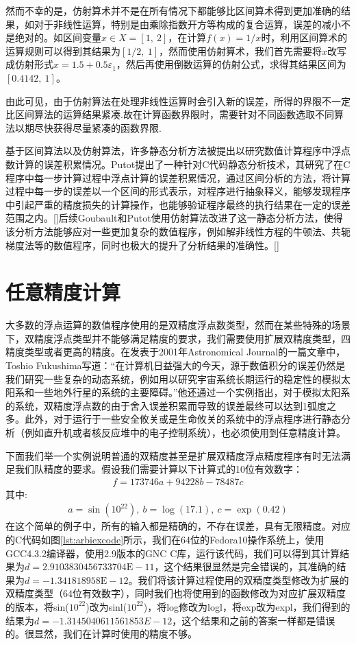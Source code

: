 然而不幸的是，仿射算术并不是在所有情况下都能够比区间算术得到更加准确的结果，如对于非线性运算，特别是由乘除指数开方等构成的复合运算，误差的减小不是绝对的。如区间变量$x \in X = [1,\ 2]$，在计算$f(x) = 1/x$时，利用区间算术的运算规则可以得到其结果为$[1/2 ,\ 1]$，然而使用仿射算术，我们首先需要将$x$改写成仿射形式$\hat{x} = 1.5 + 0.5\varepsilon_1$，然后再使用倒数运算的仿射公式，求得其结果区间为$[0.4142,\ 1]$。

由此可见，由于仿射算法在处理非线性运算时会引入新的误差，所得的界限不一定比区间算法的运算结果紧凑.故在计算函数界限时，需要针对不同函数选取不同算法以期尽快获得尽量紧凑的函数界限.

基于区间算法以及仿射算法，许多静态分析方法被提出以研究数值计算程序中浮点数计算的误差积累情况。Putot提出了一种针对C代码静态分析技术，其研究了在C程序中每一步计算过程中浮点计算的误差积累情况，通过区间分析的方法，将计算过程中每一步的误差以一个区间的形式表示，对程序进行抽象释义，能够发现程序中引起严重的精度损失的计算操作，也能够验证程序最终的执行结果在一定的误差范围之内。[]后续Goubault和Putot使用仿射算法改进了这一静态分析方法，使得该分析方法能够应对一些更加复杂的数值程序，例如解非线性方程的牛顿法、共轭梯度法等的数值程序，同时也极大的提升了分析结果的准确性。[]

\section{任意精度计算}

大多数的浮点运算的数值程序使用的是双精度浮点数类型，然而在某些特殊的场景下，双精度浮点类型并不能够满足精度的要求，我们需要使用扩展双精度类型，四精度类型或者更高的精度。在发表于2001年Astronomical Journal的一篇文章中，Toshio Fukushima写道：“在计算机日益强大的今天，源于数值积分的误差仍然是我们研究一些复杂的动态系统，例如用以研究宇宙系统长期运行的稳定性的模拟太阳系和一些地外行星的系统的主要障碍。”他还通过一个实例指出，对于模拟太阳系的系统，双精度浮点数的由于舍入误差积累而导致的误差最终可以达到1弧度之多。此外，对于运行于一些安全攸关或是生命攸关的系统中的浮点程序进行静态分析（例如直升机或者核反应堆中的电子控制系统），也必须使用到任意精度计算。

下面我们举一个实例说明普通的双精度甚至是扩展双精度浮点精度程序有时无法满足我们队精度的要求。假设我们需要计算以下计算式的10位有效数字：
\begin{align*}
    f = 173746a + 94228b - 78487c
\end{align*}
其中:
\begin{align*} 
    a = \sin(10^{22}),\ b = \log(17.1),\ c = \exp(0.42)
\end{align*}
在这个简单的例子中，所有的输入都是精确的，不存在误差，具有无限精度。对应的C代码如图\ref{lst:arbiexcode}所示，我们在64位的Fedora10操作系统上，使用GCC4.3.2编译器，使用2.9版本的GNC C库，运行该代码，我们可以得到其计算结果为$d = 2.9103830456733704\text{E}-11$，这个结果很显然是完全错误的，其准确的结果为$d = −1.341818958\text{E}−12$。我们将该计算过程使用的双精度类型修改为扩展的双精度类型（64位有效数字），同时我们也将使用到的函数修改为对应扩展双精度的版本，将sin($10^{22}$)改为sinl($10^{22}$)，将log修改为logl，将exp改为expl，我们得到的结果为$d=-1.3145040611561853E−12$，这个结果和之前的答案一样都是错误的。很显然，我们在计算时使用的精度不够。

